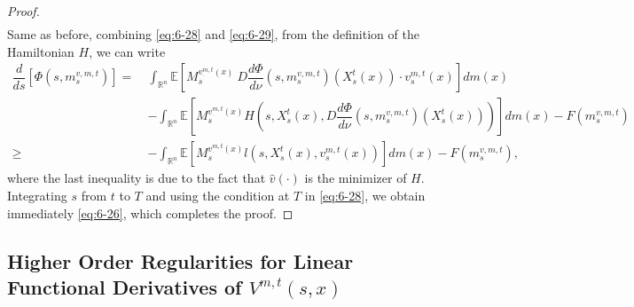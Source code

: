 \documentclass[11pt]{article}
\numberwithin{equation}{section}
\newcommand{\e}{\mathbb{E}}
\newcommand{\brn}{{\mathbb{R}^n}}
\newcommand{\1}{\mbox{1\hspace{-1mm}I}}
\begin{document}
\begin{proof}
\begin{align}
\end{align}
Same as before, combining \eqref{eq:6-28} and \eqref{eq:6-29}, from the definition of the Hamiltonian $H$,  we can write 
\begin{align*}
    \dfrac{d}{ds}\left[\Phi\left(s,m^{v,m,t}_s\right)\right] =\ & \int_{\brn} \e \left[M^{v^{m,t}_\cdot(x)}_s\:D\dfrac{d\Phi}{d\nu}\left(s,m^{v,m,t}_s\right)\left(X^{t}_s(x)\right)\cdot v^{m,t}_s(x) \right] dm(x)\\
    &-\int_{\brn}\e\left[M^{v^{m,t}_\cdot(x)}_s H\left(s,X^{t}_s(x),D\dfrac{d\Phi}{d\nu}\left(s,m^{v,m,t}_s\right)\left(X^{t}_s(x)\right) \right)\right]dm(x)-F\left(m^{v,m,t}_s\right)\\
    \geq\ & -\int_{\brn}\e\left[ M^{v^{m,t}_\cdot(x)}_s l\left(s,X^{t}_s(x),v^{m,t}_s(x)\right)\right]dm(x)-F\left(m^{v,m,t}_s\right),
\end{align*}
where the last inequality is due to the fact that $\hat{v}(\cdot)$ is the minimizer of $H$. Integrating $s$ from $t$ to $T$ and using the condition at $T$ in \eqref{eq:6-28}, we obtain immediately \eqref{eq:6-26}, which completes the proof. 
\end{proof}

\subsection{Higher Order Regularities for Linear Functional Derivatives of $V^{m,t}(s,x)$}\label{subsec:add_regularity}
\end{document}
